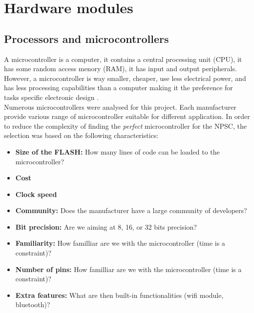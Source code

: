 \section{Hardware modules}

\subsection{Processors and microcontrollers}
A microcontroller is a computer, it contains a central processing unit (CPU), it has some random access menory (RAM), it has input and output peripherals. However, a microcontroller is way smaller, cheaper, use less electrical power, and has less processing capabilities than a computer making it the preference for tasks specific electronic design \cite{ho2000}.\\
Numerous microcontrollers were analysed for this project. Each manufacturer provide various range of microcontroller suitable for different application. In order to reduce the complexity of finding the \textit{perfect} microcontroller for the NPSC, the selection was based on the following characteristics:
\begin{itemize}
\item \textbf{Size of the FLASH:} How many lines of code can be loaded to the microcontroller?
\item \textbf{Cost}
\item \textbf{Clock speed}
\item \textbf{Community:} Does the manufacturer have a large community of developers?
\item \textbf{Bit precision:} Are we aiming at 8, 16, or 32 bits precision? 
\item \textbf{Familiarity:} How familliar are we with the microcontroller (time is a constraint)?
\item \textbf{Number of pins:} How familliar are we with the microcontroller (time is a constraint)?\
\item \textbf{Extra features:} What are then built-in functionalities (wifi module, bluetooth)?
\end{itemize}

